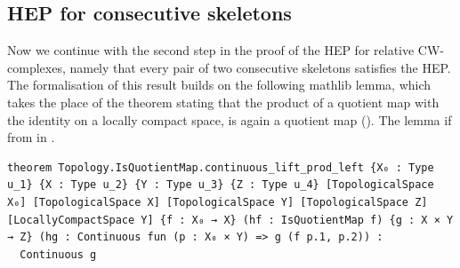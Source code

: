 \documentclass[11pt, a4paper, english]{article}
\theoremstyle{plain}
\theoremstyle{definition}
\theoremstyle{remark}
\numberwithin{equation}{section}
\numberwithin{theorem}{section}
\begin{document}
\subsection{HEP for consecutive skeletons}  \label{subsec:lean:skel}

Now we continue with the second step in the proof of the HEP for relative CW-complexes, namely that every pair of two consecutive skeletons satisfies the HEP. The formalisation of this result builds on the following mathlib lemma, which takes the place of the theorem  stating that the product of a quotient map with the identity on a locally compact space, is again a quotient map (\cite{thm:quotientproduct}). The lemma if from  in \cite{mathlib}.

\begin{verbatim}
theorem Topology.IsQuotientMap.continuous_lift_prod_left {X₀ : Type u_1} {X : Type u_2} {Y : Type u_3} {Z : Type u_4} [TopologicalSpace X₀] [TopologicalSpace X] [TopologicalSpace Y] [TopologicalSpace Z] [LocallyCompactSpace Y] {f : X₀ → X} (hf : IsQuotientMap f) {g : X × Y → Z} (hg : Continuous fun (p : X₀ × Y) => g (f p.1, p.2)) :
  Continuous g 
\end{verbatim}
\end{document}
